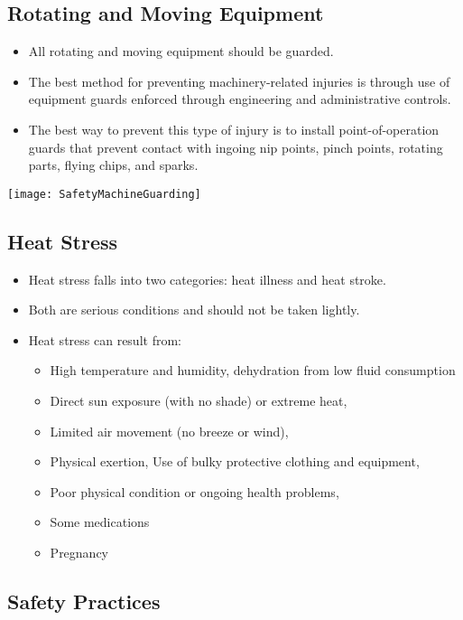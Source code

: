 \documentclass{article}
\begin{document}
\subsection{Rotating and Moving Equipment}

\begin{itemize}
\item All rotating and moving equipment should be guarded. 
\item The best method for preventing machinery-related injuries is through use of equipment guards enforced through engineering and administrative controls.   
\item The best way to prevent this type of injury is to install point-of-operation guards that prevent contact with ingoing nip points, pinch points, rotating parts, flying chips, and sparks.
\end{itemize}
\begin{center}
\texttt{[image: SafetyMachineGuarding]}\\
\end{center}

\subsection{Heat Stress}
\begin{itemize}
\item Heat stress falls into two categories: heat illness and heat stroke. 
\item Both are serious conditions and should not be taken lightly. 
\item Heat stress can result from: 
\begin{itemize}
\item High temperature and humidity, dehydration from low fluid consumption
\item Direct sun exposure (with no shade) or extreme heat, 
\item Limited air movement (no breeze or wind), 
\item Physical exertion, Use of bulky protective clothing and equipment, 
\item Poor physical condition or ongoing health problems, 
\item Some medications
\item Pregnancy
\end{itemize}
\end{itemize} 


\subsection{Safety Practices}
\end{document}
